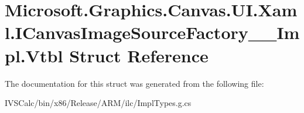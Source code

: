\hypertarget{struct_microsoft_1_1_graphics_1_1_canvas_1_1_u_i_1_1_xaml_1_1_i_canvas_image_source_factory_____impl_1_1_vtbl}{}\section{Microsoft.\+Graphics.\+Canvas.\+U\+I.\+Xaml.\+I\+Canvas\+Image\+Source\+Factory\+\_\+\+\_\+\+Impl.\+Vtbl Struct Reference}
\label{struct_microsoft_1_1_graphics_1_1_canvas_1_1_u_i_1_1_xaml_1_1_i_canvas_image_source_factory_____impl_1_1_vtbl}


The documentation for this struct was generated from the following file\+:\begin{DoxyCompactItemize}
\item 
I\+V\+S\+Calc/bin/x86/\+Release/\+A\+R\+M/ilc/Impl\+Types.\+g.\+cs\end{DoxyCompactItemize}
